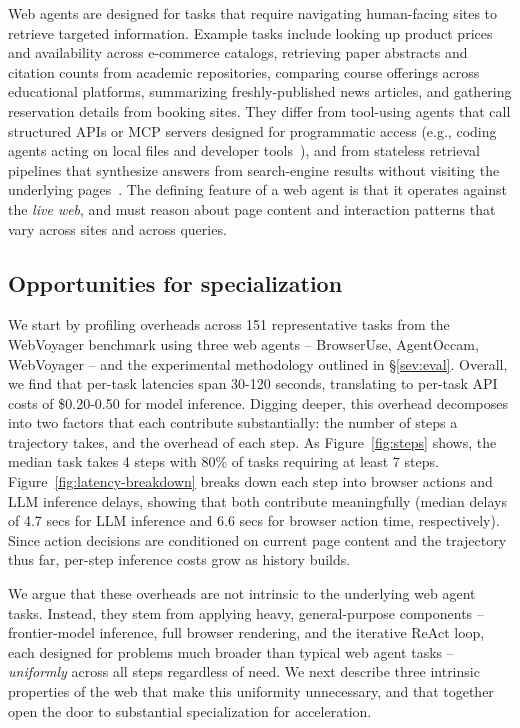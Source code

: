 Web agents are designed for tasks that require navigating human-facing sites to retrieve targeted information. Example tasks include looking up product prices and availability across e-commerce catalogs, retrieving paper abstracts and citation counts from academic repositories, comparing course offerings across educational platforms, summarizing freshly-published news articles, and gathering reservation details from booking sites. They differ from tool-using agents that call structured APIs or MCP servers designed for programmatic access (e.g., coding agents acting on local files and developer tools~\cite{swt-bench, execution-agent}), and from stateless retrieval pipelines that synthesize answers from search-engine results without visiting the underlying pages~\cite{caesar}. The defining feature of a web agent is that it operates against the \emph{live web}, and must reason about page content and interaction patterns that vary across sites and across queries.


\subsection{Opportunities for specialization}
\label{sec:opp}

We start by profiling overheads across 151 representative tasks from the WebVoyager benchmark using three web agents -- BrowserUse, AgentOccam, WebVoyager -- and the experimental methodology outlined in \S\ref{sev:eval}.  Overall, we find that per-task latencies span 30-120 seconds, translating to per-task API costs of \$0.20-0.50 for model inference. Digging deeper, this overhead decomposes into two factors that each contribute substantially: the number of steps a trajectory takes, and the overhead of each step. As Figure~\ref{fig:steps} shows, the median task takes 4 steps with 80\% of tasks requiring at least 7 steps. Figure~\ref{fig:latency-breakdown} breaks down each step into browser actions and LLM inference delays, showing that both contribute meaningfully (median delays of 4.7 secs for LLM inference and 6.6 secs for browser action time, respectively). Since action decisions are conditioned on current page content and the trajectory thus far, per-step inference costs grow as history builds.



We argue that these overheads are not intrinsic to the underlying web agent tasks. Instead, they stem from applying heavy, general-purpose components -- frontier-model inference, full browser rendering, and the iterative ReAct loop, each designed for problems much broader than typical web agent tasks -- \emph{uniformly} across all steps regardless of need. We next describe three intrinsic properties of the web that make this uniformity unnecessary, and that together open the door to substantial specialization for acceleration.


